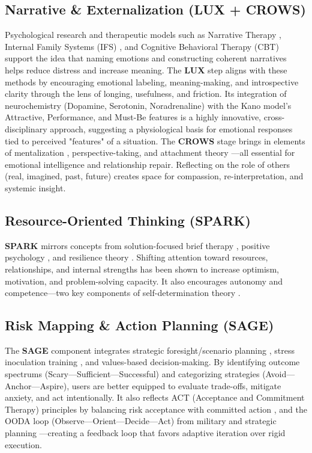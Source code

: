 \documentclass{article}
\begin{document}
\subsection{Narrative \& Externalization (LUX + CROWS)}
Psychological research and therapeutic models such as Narrative Therapy \cite{white1990narrative}, Internal Family Systems (IFS) \cite{schwartz1995internal}, and Cognitive Behavioral Therapy (CBT) \cite{beck1979cognitive} support the idea that naming emotions and constructing coherent narratives helps reduce distress and increase meaning. The \textbf{LUX} step aligns with these methods by encouraging emotional labeling, meaning-making, and introspective clarity through the lens of longing, usefulness, and friction. Its integration of neurochemistry (Dopamine, Serotonin, Noradrenaline) with the Kano model's Attractive, Performance, and Must-Be features \cite{kano1984attractive} is a highly innovative, cross-disciplinary approach, suggesting a physiological basis for emotional responses tied to perceived "features" of a situation. The \textbf{CROWS} stage brings in elements of mentalization \cite{fonagy2002affect}, perspective-taking, and attachment theory \cite{bowlby1969attachment}—all essential for emotional intelligence and relationship repair. Reflecting on the role of others (real, imagined, past, future) creates space for compassion, re-interpretation, and systemic insight.

\subsection{Resource-Oriented Thinking (SPARK)}
\textbf{SPARK} mirrors concepts from solution-focused brief therapy \cite{de1997building}, positive psychology \cite{seligman2011flourish}, and resilience theory \cite{masten2001ordinary}. Shifting attention toward resources, relationships, and internal strengths has been shown to increase optimism, motivation, and problem-solving capacity. It also encourages autonomy and competence—two key components of self-determination theory \cite{ryan2000self}.

\subsection{Risk Mapping \& Action Planning (SAGE)}
The \textbf{SAGE} component integrates strategic foresight/scenario planning \cite{schoemaker1995scenario}, stress inoculation training \cite{meichenbaum1985stress}, and values-based decision-making. By identifying outcome spectrums (Scary—Sufficient—Successful) and categorizing strategies (Avoid—Anchor—Aspire), users are better equipped to evaluate trade-offs, mitigate anxiety, and act intentionally. It also reflects ACT (Acceptance and Commitment Therapy) principles by balancing risk acceptance with committed action \cite{hayes1999acceptance}, and the OODA loop (Observe—Orient—Decide—Act) from military and strategic planning \cite{boyd1986destruction}—creating a feedback loop that favors adaptive iteration over rigid execution.
\end{document}
